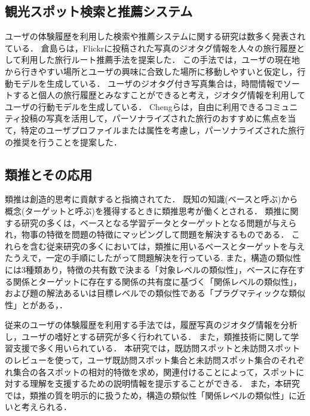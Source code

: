 \documentclass[submit]{ipsj}
\begin{document}
\subsection{観光スポット検索と推薦システム}
ユーザの体験履歴を利用した検索や推薦システムに関する研究は数多く発表されている．
倉島ら\cite{Codd01}は，Flickrに投稿された写真のジオタグ情報を人々の旅行履歴として利用した旅行ルート推薦手法を提案した．
この手法では，ユーザの現在地から行きやすい場所とユーザの興味に合致した場所に移動しやすいと仮定し，行動モデルを生成している．
ユーザのジオタグ付き写真集合は，時間情報でソートすると個人の旅行履歴とみなすことができると考え，ジオタグ情報を利用してユーザの行動モデルを生成している．
Chengらは\cite{Codd03}，自由に利用できるコミュニティ投稿の写真を活用して，パーソナライズされた旅行のおすすめに焦点を当て，特定のユーザプロファイルまたは属性を考慮し，パーソナライズされた旅行の推奨を行うことを提案した．

\subsection{類推とその応用}
類推は創造的思考に貢献すると指摘されてた\cite{Codd04}．
既知の知識(ベースと呼ぶ)から概念(ターゲットと呼ぶ)を獲得するときに類推思考が働くとされる\cite{Codd05}．
類推に関する研究の多くは，ベースとなる学習データとターゲットとなる問題が与えられ，物事の特徴を問題の特徴にマッピングして問題を解決するもの\cite{Codd06}である．
これらを含む従来研究の多くにおいては，類推に用いるベースとターゲットを与えたうえで，一定の手順にしたがって問題解決を行っている.
また，構造の類似性には3種類あり，特徴の共有数で決まる「対象レベルの類似性」，ベースに存在する関係とターゲットに存在する関係の共有度に基づく「関係レベルの類似性」，および題の解法あるいは目標レベルでの類似性である「プラグマティックな類似性」とがある\cite{Codd05}，\cite{Codd09}．

従来のユーザの体験履歴を利用する手法では，履歴写真のジオタグ情報を分析し，ユーザの嗜好とする研究が多く行われている．
また，類推技術に関して学習支援で多く用いられている．
本研究では，既訪問スポットと未訪問スポットのレビューを使って，ユーザ既訪問スポット集合と未訪問スポット集合のそれぞれ集合の各スポットの相対的特徴を求め，関連付けることによって，スポットに対する理解を支援するための説明情報を提示することができる．
また，本研究では，類推の質を明示的に扱うため，構造の類似性「関係レベルの類似性」に近いと考えられる．
\end{document}
